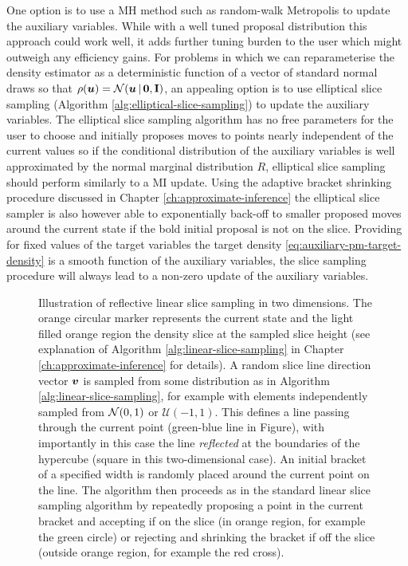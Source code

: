 One option is to use a \ac{MH} method such as random-walk Metropolis to update the auxiliary variables. While with a well tuned proposal distribution this approach could work well, it adds further tuning burden to the user which might outweigh any efficiency gains. For problems in which we can reparameterise the density estimator as a deterministic function of a vector of standard normal draws so that $\rho(\vct{u}) = \nrm{\vct{u} \gvn \vct{0},\mathbf{I}}$, an appealing option is to use elliptical slice sampling (Algorithm \ref{alg:elliptical-slice-sampling}) to update the auxiliary variables. The elliptical slice sampling algorithm has no free parameters for the user to choose and initially proposes moves to points nearly independent of the current values \citep{murray2010elliptical} so if the conditional distribution of the auxiliary variables is well approximated by the normal marginal distribution $R$, elliptical slice sampling should perform similarly to a \ac{MI} update. Using the adaptive bracket shrinking procedure discussed in Chapter \ref{ch:approximate-inference} the elliptical slice sampler is also however able to exponentially back-off to smaller proposed moves around the current state if the bold initial proposal is not on the slice. Providing for fixed values of the target variables the target density \eqref{eq:auxiliary-pm-target-density} is a smooth function of the auxiliary variables, the slice sampling procedure will always lead to a non-zero update of the auxiliary variables. %

\begin{figure}[t]
\centering
{}
\caption[Reflective linear slice sampling.]{Illustration of reflective linear slice sampling in two dimensions. The orange circular marker represents the current state and the light filled orange region the density slice at the sampled slice height (see explanation of Algorithm \ref{alg:linear-slice-sampling} in Chapter \ref{ch:approximate-inference} for details). A random slice line direction vector $\boldsymbol{v}$ is sampled from some distribution as in Algorithm \ref{alg:linear-slice-sampling}, for example with elements independently sampled from $\nrm{0,1}$ or $\mathcal{U}(-1,1)$. This defines a line passing through the current point (green-blue line in Figure), with importantly in this case the line \emph{reflected} at the boundaries of the hypercube (square in this two-dimensional case). An initial bracket of a specified width is randomly placed around the current point on the line. The algorithm then proceeds as in the standard linear slice sampling algorithm by repeatedly proposing a point in the current bracket and accepting if on the slice (in orange region, for example the green circle) or rejecting and shrinking the bracket if off the slice (outside orange region, for example the red cross).}
\label{fig:reflective-linear-slice-sampling}
\end{figure}

